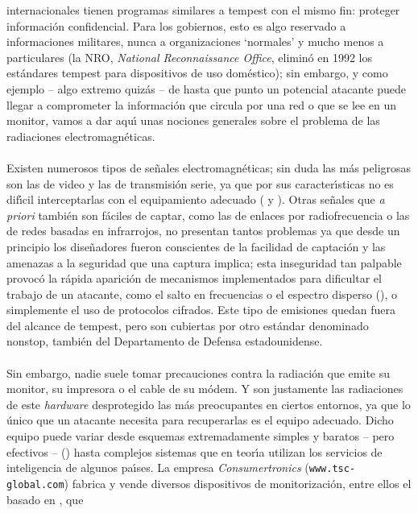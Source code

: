 internacionales tienen programas similares a {\sc tempest} con el mismo fin:
proteger informaci\'on confidencial. Para los gobiernos, esto es algo reservado 
a informaciones militares, nunca a organizaciones `normales' y mucho menos a 
particulares (la NRO, {\it National Reconnaissance Office}, elimin\'o en 1992
los est\'andares {\sc tempest} para dispositivos de uso dom\'estico); sin 
embargo, y como ejemplo -- algo extremo quiz\'as -- de hasta que punto 
un potencial atacante puede llegar a comprometer la informaci\'on que circula 
por una red o que se lee en un monitor, vamos a dar aqu\'{\i} unas nociones 
generales sobre el problema de las radiaciones electromagn\'eticas.\\
\\Existen numerosos tipos de se\~nales electromagn\'eticas; sin duda las m\'as 
peligrosas son las de video y las de transmisi\'on serie, ya que por sus 
caracter\'{\i}sticas no es dif\'{\i}cil interceptarlas con el equipamiento 
adecuado (\cite{kn:eck85} y \cite{kn:smu90}). Otras se\~nales que {\it a 
priori} tambi\'en son f\'aciles de captar, como las de enlaces por 
radiofrecuencia o las de redes basadas en infrarrojos, no presentan tantos 
problemas ya que desde un principio los dise\~nadores fueron conscientes de la 
facilidad de captaci\'on y las amenazas a la seguridad que una captura implica;
esta inseguridad tan palpable provoc\'o la r\'apida aparici\'on de mecanismos 
implementados para dificultar el trabajo de un atacante, como el salto en 
frecuencias o el espectro disperso (\cite{kn:koh95}), o simplemente el uso de 
protocolos cifrados. Este tipo de emisiones quedan fuera del alcance de {\sc 
tempest}, pero son cubiertas por otro est\'andar denominado {\sc nonstop}, 
tambi\'en del Departamento de Defensa estadounidense.\\
\\Sin embargo, nadie suele tomar precauciones contra la radiaci\'on que emite 
su monitor, su impresora o el cable de su m\'odem. Y son justamente las
radiaciones de este {\it hardware} desprotegido las m\'as
preocupantes en ciertos entornos, ya que lo \'unico que un atacante necesita
para recuperarlas es el equipo adecuado. Dicho equipo puede variar desde 
esquemas extremadamente simples y baratos -- pero efectivos -- 
(\cite{kn:hig88}) hasta complejos sistemas que en teor\'{\i}a utilizan los 
servicios de inteligencia de algunos pa\'{\i}ses. La empresa {\it 
Consumertronics} ({\tt www.tsc-global.com}) fabrica y vende diversos 
dispositivos de monitorizaci\'on, entre ellos el basado en \cite{kn:eck85}, que
